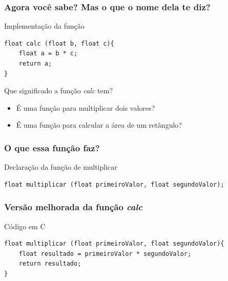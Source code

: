 \begin{frame}[fragile]
	\frametitle{Agora você sabe? Mas o que o nome dela te diz?}

	\begin{listing}[H]
		\caption{Implementação da função}
		\begin{verbatim}
float calc (float b, float c){
	float a = b * c;
	return a;
}
		\end{verbatim}
	\end{listing}

\end{frame}

\begin{frame}

	{\Huge Que significado a função \textit{calc} tem?}
	\begin{itemize}
		\item É uma função para multiplicar dois valores?
		\item É uma função para calcular a área de um retângulo?
	\end{itemize}
\end{frame}

\begin{frame}[fragile]
	\frametitle{O que essa função faz?}

	\begin{listing}[H]
		\caption{Declaração da função de multiplicar}
		\begin{verbatim}
float multiplicar (float primeiroValor, float segundoValor);
		\end{verbatim}
	\end{listing}

\end{frame}

\begin{frame}[fragile]
	\frametitle{Versão melhorada da função \textit{calc}}

	\begin{listing}[H]
		\caption{Código em C}
		\begin{verbatim}
float multiplicar (float primeiroValor, float segundoValor){
	float resultado = primeiroValor * segundoValor;
	return resultado;
}
		\end{verbatim}
	\end{listing}

\end{frame}


